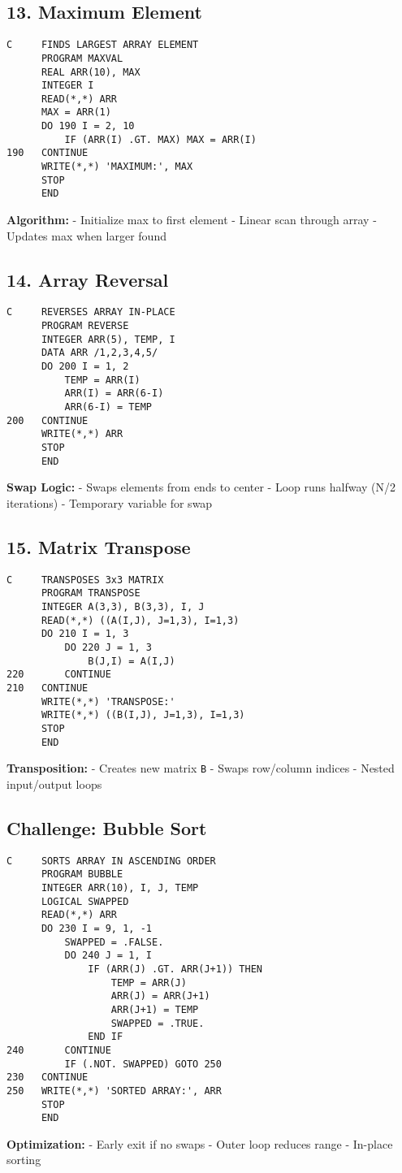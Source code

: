 \documentclass{book}
\begin{document}
\subsection*{13. Maximum Element}
\begin{verbatim}
C     FINDS LARGEST ARRAY ELEMENT
      PROGRAM MAXVAL
      REAL ARR(10), MAX
      INTEGER I
      READ(*,*) ARR
      MAX = ARR(1)
      DO 190 I = 2, 10
          IF (ARR(I) .GT. MAX) MAX = ARR(I)
190   CONTINUE
      WRITE(*,*) 'MAXIMUM:', MAX
      STOP
      END
\end{verbatim}
\textbf{Algorithm:}
- Initialize max to first element
- Linear scan through array
- Updates max when larger found

\subsection*{14. Array Reversal}
\begin{verbatim}
C     REVERSES ARRAY IN-PLACE
      PROGRAM REVERSE
      INTEGER ARR(5), TEMP, I
      DATA ARR /1,2,3,4,5/
      DO 200 I = 1, 2
          TEMP = ARR(I)
          ARR(I) = ARR(6-I)
          ARR(6-I) = TEMP
200   CONTINUE
      WRITE(*,*) ARR
      STOP
      END
\end{verbatim}
\textbf{Swap Logic:}
- Swaps elements from ends to center
- Loop runs halfway (N/2 iterations)
- Temporary variable for swap

\subsection*{15. Matrix Transpose}
\begin{verbatim}
C     TRANSPOSES 3x3 MATRIX
      PROGRAM TRANSPOSE
      INTEGER A(3,3), B(3,3), I, J
      READ(*,*) ((A(I,J), J=1,3), I=1,3)
      DO 210 I = 1, 3
          DO 220 J = 1, 3
              B(J,I) = A(I,J)
220       CONTINUE
210   CONTINUE
      WRITE(*,*) 'TRANSPOSE:'
      WRITE(*,*) ((B(I,J), J=1,3), I=1,3)
      STOP
      END
\end{verbatim}
\textbf{Transposition:}
- Creates new matrix \texttt{B}
- Swaps row/column indices
- Nested input/output loops

\subsection*{Challenge: Bubble Sort}
\begin{verbatim}
C     SORTS ARRAY IN ASCENDING ORDER
      PROGRAM BUBBLE
      INTEGER ARR(10), I, J, TEMP
      LOGICAL SWAPPED
      READ(*,*) ARR
      DO 230 I = 9, 1, -1
          SWAPPED = .FALSE.
          DO 240 J = 1, I
              IF (ARR(J) .GT. ARR(J+1)) THEN
                  TEMP = ARR(J)
                  ARR(J) = ARR(J+1)
                  ARR(J+1) = TEMP
                  SWAPPED = .TRUE.
              END IF
240       CONTINUE
          IF (.NOT. SWAPPED) GOTO 250
230   CONTINUE
250   WRITE(*,*) 'SORTED ARRAY:', ARR
      STOP
      END
\end{verbatim}
\textbf{Optimization:}
- Early exit if no swaps
- Outer loop reduces range
- In-place sorting
\end{document}
